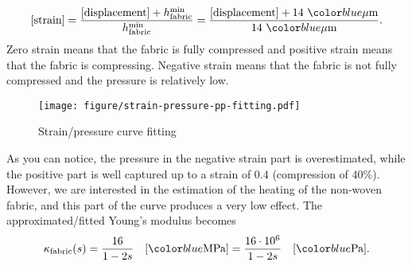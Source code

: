 \[
   [\textrm{strain}]
   = \dfrac{[\textrm{displacement}]+\htissuemin}{\htissuemin}
   = \dfrac{[\textrm{displacement}]+14 \ \unit{$\mu$m}}{14 \ \unit{$\mu$m}}.
\]
Zero strain means that the fabric is fully compressed and positive strain means that the fabric is compressing. Negative strain means that the fabric is not fully compressed and the pressure is relatively low.
\begin{figure}[H]
  \begin{center}
    \texttt{[image: figure/strain-pressure-pp-fitting.pdf]}
  \end{center}
  \caption{Strain/pressure curve fitting}
  \label{fig:sp:fitting}
\end{figure}
As you can notice, the pressure in the negative strain part is overestimated, while the positive part is well captured up to a strain of $0.4$ (compression of $40\%$). However, we are interested in the estimation of the heating of the non-woven fabric, and this part of the curve produces a very low effect. The approximated/fitted Young's modulus becomes
\begin{equation}\label{eq:Y:module:tissue}
  \Ytissue(s)
  = \dfrac{16}{1-2s}\quad [\unit{MPa}]
  = \dfrac{16\cdot 10^6}{1-2s}\quad [\unit{Pa}].
\end{equation}

